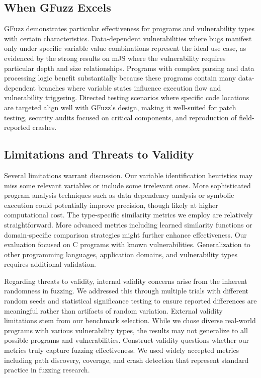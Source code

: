 \documentclass[review]{elsarticle}
\begin{document}
\subsection{When GFuzz Excels}

GFuzz demonstrates particular effectiveness for programs and vulnerability types with certain characteristics. Data-dependent vulnerabilities where bugs manifest only under specific variable value combinations represent the ideal use case, as evidenced by the strong results on mJS where the vulnerability requires particular depth and size relationships. Programs with complex parsing and data processing logic benefit substantially because these programs contain many data-dependent branches where variable states influence execution flow and vulnerability triggering. Directed testing scenarios where specific code locations are targeted align well with GFuzz's design, making it well-suited for patch testing, security audits focused on critical components, and reproduction of field-reported crashes.

\subsection{Limitations and Threats to Validity}

Several limitations warrant discussion. Our variable identification heuristics may miss some relevant variables or include some irrelevant ones. More sophisticated program analysis techniques such as data dependency analysis or symbolic execution could potentially improve precision, though likely at higher computational cost. The type-specific similarity metrics we employ are relatively straightforward. More advanced metrics including learned similarity functions or domain-specific comparison strategies might further enhance effectiveness. Our evaluation focused on C programs with known vulnerabilities. Generalization to other programming languages, application domains, and vulnerability types requires additional validation.

Regarding threats to validity, internal validity concerns arise from the inherent randomness in fuzzing. We addressed this through multiple trials with different random seeds and statistical significance testing to ensure reported differences are meaningful rather than artifacts of random variation. External validity limitations stem from our benchmark selection. While we chose diverse real-world programs with various vulnerability types, the results may not generalize to all possible programs and vulnerabilities. Construct validity questions whether our metrics truly capture fuzzing effectiveness. We used widely accepted metrics including path discovery, coverage, and crash detection that represent standard practice in fuzzing research.
\end{document}
